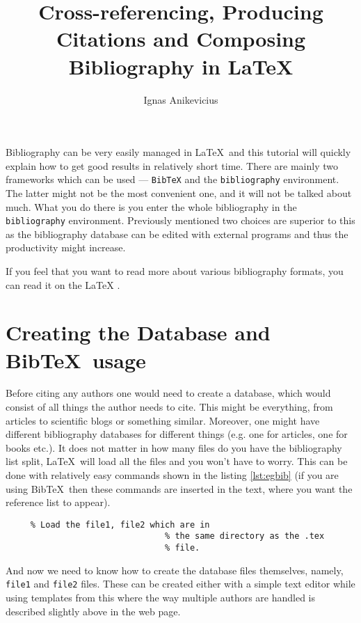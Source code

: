 \documentclass[
    draft
]{scrartcl}
\title{Cross-referencing, Producing Citations and Composing Bibliography in \LaTeX{}}
\author{Ignas Anikevicius}
\date{}
\begin{document}
\maketitle
\tableofcontents
\listoftodos

Bibliography can be very easily managed in \LaTeX\ and this tutorial will
quickly explain how to get good results in relatively short time.  There are
mainly two frameworks which can be used --- \verb|BibTeX| and the
\verb|bibliography| environment. The latter might not be the most convenient
one, and it will not be talked about much. What you do there is you enter
the whole bibliography in the \verb|bibliography| environment. Previously
mentioned two choices are superior to this as the bibliography database can
be edited with external programs and thus the productivity might increase.

If you feel that you want to read more about various bibliography formats,
you can read it on the LaTeX
.\cite{latexwikibook:bibliography}


\section{Creating the Database and Bib\TeX\ usage}

Before citing any authors one would need to create a database, which would
consist of all things the author needs to cite. 
%
This might be everything, from articles to scientific blogs or something
similar. 
%
Moreover, one might have different bibliography databases for different things
(e.g. one for articles, one for books etc.). 
%
It does not matter in how many files do you have the bibliography list split,
\LaTeX\ will load all the files and you won't have to worry. 
%
This can be done with relatively easy commands shown in the listing
\ref{lst:egbib} (if you are using Bib\TeX\ then these commands are inserted in
the text, where you want the reference list to appear).
%
\begin{lstlisting}[caption={Example code to get BibTeX working},label=lst:egbib]
       % Load the plain style
     % Load the file1, file2 which are in
                                % the same directory as the .tex
                                % file.
\end{lstlisting}



And now we need to know how to create the database files themselves, namely,
\verb|file1| and \verb|file2| files. 
%
These can be created either with a simple text editor while using templates from
this
where the way multiple authors are handled is described slightly above in the
web page.
\end{document}
